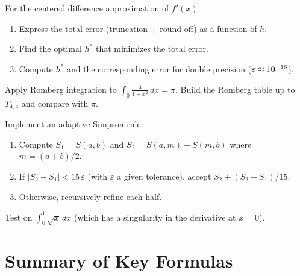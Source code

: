 \begin{exercise}[$\star\star$]
\label{ex:ch7-optimal-h}
For the centered difference approximation of $f'(x)$:
\begin{enumerate}
    \item Express the total error (truncation + round-off) as a function of $h$.
    \item Find the optimal $h^*$ that minimizes the total error.
    \item Compute $h^*$ and the corresponding error for double precision ($\varepsilon \approx 10^{-16}$).
\end{enumerate}
\end{exercise}

\begin{exercise}[$\star\star$]
\label{ex:ch7-romberg}
Apply Romberg integration to $\int_0^1 \frac{4}{1+x^2}\,dx = \pi$.
Build the Romberg table up to $T_{4,4}$ and compare with $\pi$.
\end{exercise}

\begin{exercise}[$\star\star\star$]
\label{ex:ch7-adaptive}
Implement an adaptive Simpson rule:
\begin{enumerate}
    \item Compute $S_1 = S(a,b)$ and $S_2 = S(a,m) + S(m,b)$ where $m = (a+b)/2$.
    \item If $|S_2 - S_1| < 15\,\varepsilon$ (with $\varepsilon$ a given tolerance), accept $S_2 + (S_2 - S_1)/15$.
    \item Otherwise, recursively refine each half.
\end{enumerate}
Test on $\int_0^1 \sqrt{x}\,dx$ (which has a singularity in the derivative at $x=0$).
\end{exercise}

\section*{Summary of Key Formulas}

